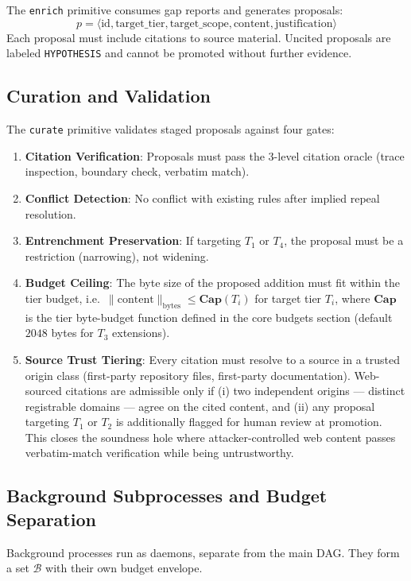 \documentclass[11pt]{article}
\begin{document}
The \texttt{enrich} primitive consumes gap reports and generates proposals:
\[
p = \langle \text{id}, \text{target\_tier}, \text{target\_scope}, \text{content}, \text{justification} \rangle
\]
Each proposal must include citations to source material. Uncited proposals are labeled \texttt{HYPOTHESIS} and cannot be promoted without further evidence.

\subsection{Curation and Validation}
The \texttt{curate} primitive validates staged proposals against four gates:
\begin{enumerate}
    \item \textbf{Citation Verification}: Proposals must pass the 3-level citation oracle (trace inspection, boundary check, verbatim match).
    \item \textbf{Conflict Detection}: No conflict with existing rules after implied repeal resolution.
    \item \textbf{Entrenchment Preservation}: If targeting $T_1$ or $T_4$, the proposal must be a restriction (narrowing), not widening.
    \item \textbf{Budget Ceiling}: The byte size of the proposed addition must fit within the tier budget, i.e.\ $\|\text{content}\|_{\text{bytes}} \le \mathbf{Cap}(T_i)$ for target tier $T_i$, where $\mathbf{Cap}$ is the tier byte-budget function defined in the core budgets section (default $2048$ bytes for $T_3$ extensions).
    \item \textbf{Source Trust Tiering}: Every citation must resolve to a source in a trusted origin class (first-party repository files, first-party documentation). Web-sourced citations are admissible only if (i) two independent origins --- distinct registrable domains --- agree on the cited content, and (ii) any proposal targeting $T_1$ or $T_2$ is additionally flagged for human review at promotion. This closes the soundness hole where attacker-controlled web content passes verbatim-match verification while being untrustworthy.
\end{enumerate}

\subsection{Background Subprocesses and Budget Separation}
Background processes run as daemons, separate from the main DAG. They form a set $\mathcal{B}$ with their own budget envelope.
\end{document}
